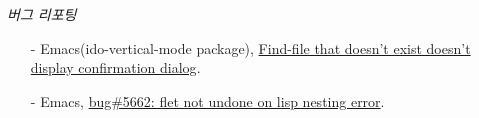 \documentclass[line,margin]{res}
\begin{document}
\begin{resume}
  {\sl 버그 리포팅}
  \vspace{-4mm}
  {
    \small
    \begin{itemize}
    \item[-] Emacs({\footnotesize ido-vertical-mode package}),
      \href{https://github.com/gempesaw/ido-vertical-mode.el/issues/14#issuecomment-74077234}
      {Find-file that doesn't exist doesn't display confirmation dialog}.
    \item[-] Emacs,
      \href{https://lists.gnu.org/archive/html/bug-gnu-emacs/2014-11/msg00518.html}
      {bug\#5662: flet not undone on lisp nesting error}.
    \end{itemize}
  }

\end{resume}

\end{document}
